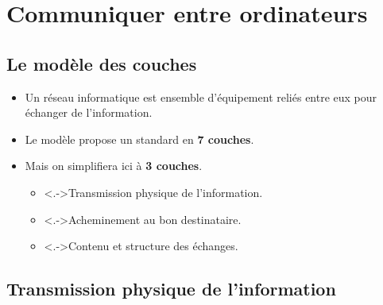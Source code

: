 \section[Communiquer]{Communiquer entre ordinateurs} %



\subsection{Le modèle des couches}
\begin{frame}
	\begin{itemize}
		\item Un réseau informatique est ensemble d'équipement reliés entre eux pour échanger de l'information.
		\item Le modèle \textbf{} propose un standard en \textbf{7 couches}.
		\item Mais on simplifiera ici à \textbf{3 couches}. %
		\begin{itemize}
			\item<.->Transmission physique de l'information.
			\item<.->Acheminement au bon destinataire.
			\item<.->Contenu et structure des échanges.
		\end{itemize}		
	\end{itemize}
\end{frame}
\subsection{Transmission physique de l'information}

